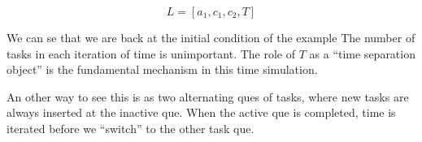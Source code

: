 \begin{equation}
	\nonumber
	L = [a_1, c_1, c_2, T ]
\end{equation}

We can se that we are back at the initial condition of the example
The number of tasks in each iteration of time is unimportant. 
The role of $T$ as a ``time separation object'' is the fundamental mechanism in this time simulation.

An other way to see this is as two alternating ques of tasks, where new tasks are always inserted at the inactive que. 
When the active que is completed, time is iterated before we ``switch'' to the other task que.

\newpage



	















